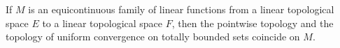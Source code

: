 If $M$ is an equicontinuous family of linear functions from a linear topological space $E$ to a linear topological space $F$, then the pointwise topology and the topology of uniform convergence on totally bounded sets coincide on $M$.
